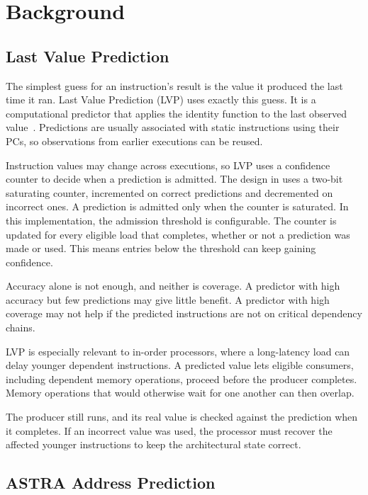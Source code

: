 \section{Background}

\subsection{Last Value Prediction}

The simplest guess for an instruction's result is the value it
produced the last time it ran. Last Value Prediction (LVP) uses
exactly this guess. It is a computational
predictor that applies the identity function to the last observed
value~\cite{ravenel2025architecting}. Predictions are usually
associated with static instructions using their PCs, so observations
from earlier executions can be reused.

Instruction values may change across executions, so LVP uses a
confidence counter to decide when a prediction is admitted. The design
in \cite{ravenel2025architecting} uses a two-bit saturating counter,
incremented on correct predictions and decremented on incorrect
ones. A prediction is admitted only when the counter is saturated.
In this implementation, the admission threshold is configurable.
The counter is updated for every eligible load that completes,
whether or not a prediction was made or used. This means entries
below the threshold can keep gaining confidence.

Accuracy alone is not enough, and neither is coverage. A predictor with high accuracy but few
predictions may give little benefit. A predictor with high coverage
may not help if the predicted instructions are not on critical
dependency chains.

LVP is especially relevant to in-order processors, where a
long-latency load can delay younger dependent instructions. A
predicted value lets eligible consumers, including dependent memory
operations, proceed before the producer completes. Memory operations
that would otherwise wait for one another can then overlap.

The producer still runs, and its real value is checked against the
prediction when it completes. If an
incorrect value was used, the processor must recover the affected
younger instructions to keep the architectural state correct.

\subsection{ASTRA Address Prediction}

